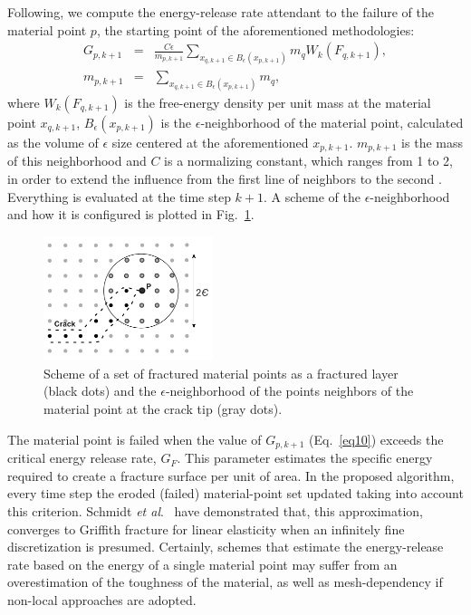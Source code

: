 \documentclass[applsci,journal,article,submit,moreauthors,pdftex]{Definitions/mdpi}
\begin{document}
Following, we compute the energy-release rate attendant to the failure of the material point $p$, the starting point of the aforementioned methodologies:
\begin{eqnarray}
G_{p,k+1}&=&\frac{C\epsilon}{m_{p,k+1}}\sum_{x_{q,k+1}\in B_\epsilon (x_{p,k+1})}m_qW_k(F_{q,k+1}), \nonumber\\
m_{p,k+1}&=&\sum_{x_{q,k+1}\in B_\epsilon (x_{p,k+1})}m_q\label{eq10},
\end{eqnarray}
where $W_k(F_{q,k+1})$ is the free-energy density per unit mass at the material point $x_{q, k+1}$, $B_\epsilon (x_{p,k+1})$ is the $\epsilon$-neighborhood of the material point, calculated as the volume of $\epsilon$ size centered at the aforementioned $x_{p,k+1}$. $m_{p,k+1}$ is the mass of this neighborhood and $C$ is a normalizing constant, which ranges from 1 to 2, in order to extend the influence from the first line of neighbors to the second \cite{schmidt09,Pandolfi_12}. Everything is evaluated at the time step $k+1$. A scheme of the $\epsilon$-neighborhood and how it is configured is plotted in Fig.~\ref{fig3}.

\begin{figure}
\centering
\includegraphics[width=0.44\textwidth]{Figs/eroded_neighbors_2.pdf}
\caption{Scheme of a set of fractured material points as a fractured layer (black dots) and the $\epsilon$-neighborhood of the points neighbors of the material point at the crack tip (gray dots).}
\label{fig3}
\end{figure}

The material point is failed when the value of $G_{p,k+1}$ (Eq.~\eqref{eq10}) exceeds the critical energy release rate, $G_F$. This parameter estimates the specific energy required to create a fracture surface per unit of area. In the proposed algorithm, every time step the eroded (failed) material-point set updated taking into account this criterion. Schmidt \textit{et al}.~\cite{schmidt09} have demonstrated that, this approximation, converges to Griffith fracture for linear elasticity when an infinitely fine discretization is presumed. 
Certainly, schemes that estimate the energy-release rate based on the energy of a single material point may suffer from an overestimation of the toughness of the material, as well as mesh-dependency if non-local approaches are adopted.
\end{document}

